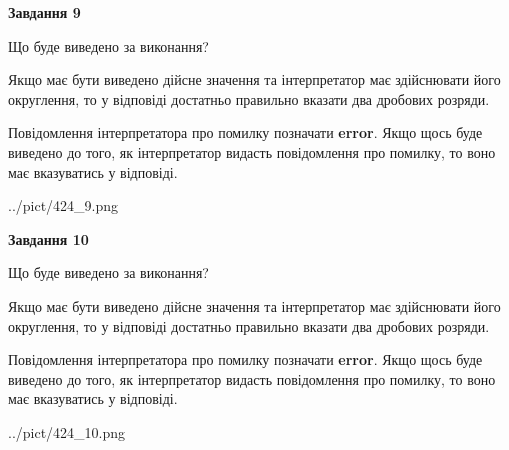 \documentclass[12pt, ukrainian]{article}
\begin{document}
{\begin {Large}
{\begin {center}\textbf{Завдання 9}\end {center}}\par
Що буде виведено за виконання? \par

Якщо має бути виведено дійсне значення та інтерпретатор має здійснювати його округлення, 
то у відповіді достатньо правильно вказати два дробових розряди.

Повідомлення інтерпретатора про помилку позначати \textbf{error}.
Якщо щось буде виведено до того, як інтерпретатор видасть повідомлення про помилку, 
то воно має вказуватись у відповіді. \par

\begin{center}
	{../pict/424_9.png}
\end{center}
\newpage

{\begin {center}\textbf{Завдання 10}\end {center}}\par
Що буде виведено за виконання? \par

Якщо має бути виведено дійсне значення та інтерпретатор має здійснювати його округлення, 
то у відповіді достатньо правильно вказати два дробових розряди.

Повідомлення інтерпретатора про помилку позначати \textbf{error}.
Якщо щось буде виведено до того, як інтерпретатор видасть повідомлення про помилку, 
то воно має вказуватись у відповіді. \par

\begin{center}
	{../pict/424_10.png}
\end{center}
\newpage

\end {Large}}
\end{document}
